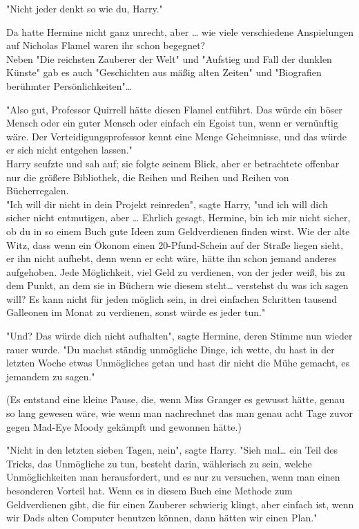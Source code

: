 {"Nicht jeder denkt so wie du, Harry."

Da hatte Hermine nicht ganz unrecht, aber … wie viele verschiedene Anspielungen auf Nicholas Flamel waren ihr schon begegnet?\\ Neben "Die reichsten Zauberer der Welt" und "Aufstieg und Fall der dunklen Künste" gab es auch "Geschichten aus mäßig alten Zeiten" und "Biografien berühmter Persönlichkeiten"…

"Also gut, Professor Quirrell hätte diesen Flamel entführt. Das würde ein böser Mensch oder ein guter Mensch oder einfach ein Egoist tun, wenn er vernünftig wäre. Der Verteidigungsprofessor kennt eine Menge Geheimnisse, und das würde er sich nicht entgehen lassen."\\ Harry seufzte und sah auf; sie folgte seinem Blick, aber er betrachtete offenbar nur die größere Bibliothek, die Reihen und Reihen und Reihen von Bücherregalen.\\ "Ich will dir nicht in dein Projekt reinreden", sagte Harry, "und ich will dich sicher nicht entmutigen, aber … Ehrlich gesagt, Hermine, bin ich mir nicht sicher, ob du in so einem Buch gute Ideen zum Geldverdienen finden wirst. Wie der alte Witz, dass wenn ein Ökonom einen 20-Pfund-Schein auf der Straße liegen sieht, er ihn nicht aufhebt, denn wenn er echt wäre, hätte ihn schon jemand anderes aufgehoben. Jede Möglichkeit, viel Geld zu verdienen, von der jeder weiß, bis zu dem Punkt, an dem sie in Büchern wie diesem steht… verstehst du was ich sagen will? Es kann nicht für jeden möglich sein, in drei einfachen Schritten tausend Galleonen im Monat zu verdienen, sonst würde es jeder tun."

"Und? Das würde dich nicht aufhalten", sagte Hermine, deren Stimme nun wieder rauer wurde. "Du machst ständig unmögliche Dinge, ich wette, du hast in der letzten Woche etwas Unmögliches getan und hast dir nicht die Mühe gemacht, es jemandem zu sagen."

(Es entstand eine kleine Pause, die, wenn Miss Granger es gewusst hätte, genau so lang gewesen wäre, wie wenn man nachrechnet das man genau acht Tage zuvor gegen Mad-Eye Moody gekämpft und gewonnen hätte.)

"Nicht in den letzten sieben Tagen, nein", sagte Harry. "Sieh mal… ein Teil des Tricks, das Unmögliche zu tun, besteht darin, wählerisch zu sein, welche Unmöglichkeiten man herausfordert, und es nur zu versuchen, wenn man einen besonderen Vorteil hat. Wenn es in diesem Buch eine Methode zum Geldverdienen gibt, die für einen Zauberer schwierig klingt, aber einfach ist, wenn wir Dads alten Computer benutzen können, dann hätten wir einen Plan."

}
